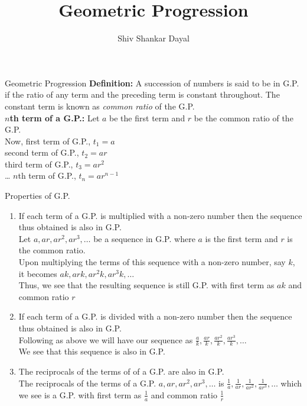 \documentclass[aspectratio=169,8pt]{beamer}
\title{Geometric Progression}
\author[Shiv Shankar Dayal]{Shiv Shankar Dayal}
\begin{document}
\begin{frame}
       \titlepage
\end{frame}
\begin{frame}{Geometric Progression}
  \textbf{Definition:} A succession of numbers is said to be in G.P. if the
  ratio of any term and the preceding term is constant throughout. The constant
  term is known as \textit{common ratio} of the G.P.\\
  \textbf{$n$th term of a G.P.:} Let $a$ be the first term and $r$ be the
  common ratio of the G.P.\\
  \vspace{.5cm}
  Now, first term of G.P., $t_1 = a$\\
  second term of G.P., $t_2 = ar$\\
  third term of G.P., $t_3 = ar^2$\\
  \ldots
  $n$th term of G.P., $t_n = ar^{n - 1}$
\end{frame}
\begin{frame}{Properties of G.P.}
  \begin{enumerate}
    \item If each term of a G.P. is multiplied with a non-zero number then the
      sequence thus obtained is also in G.P.\\
      \vspace{.3cm}
      Let $a, ar, ar^2, ar^3, \ldots$ be a sequence in G.P. where $a$ is the
      first term and $r$ is the common ratio.\\
      \vspace{.3cm}
      Upon multiplying the terms of this sequence with a non-zero number, say
      $k$, it becomes $ak, ark, ar^2k, ar^3k, \ldots$\\
      \vspace{.3cm}
      Thus, we see that the resulting sequence is still G.P. with first term
      as $ak$ and common ratio $r$\\
    \item If each term of a G.P. is divided with a non-zero number then the
      sequence thus obtained is also in G.P.\\
      \vspace{.3cm}
      Following as above we will have our sequence as $\frac{a}{k},
      \frac{ar}{k}, \frac{ar^2}{k}, \frac{ar^3}{k},\dots$\\
      \vspace{.3cm}
      We see that this sequence is also in G.P.
    \item The reciprocals  of the terms of of a G.P. are also in G.P.\\
      \vspace{.3cm}
      The reciprocals of the terms of a G.P. $a, ar, ar^2, ar^3, \ldots$ is
      $\frac{1}{a}, \frac{1}{ar}, \frac{1}{ar^2}, \frac{1}{ar^3},\ldots$ which
      we see is a G.P. with first term as $\frac{1}{a}$ and common ratio
      $\frac{1}{r}$
  \end{enumerate}
\end{frame}
\end{document}
